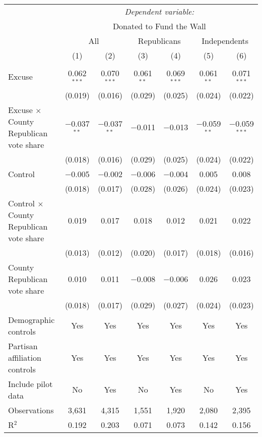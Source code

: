 
\begin{table}[!htbp] \centering 
  \label{t:2-cityheterogeneity} 
\begin{threeparttable}
\begin{tabular}{@{\hspace{5pt}}l@{\hspace{5pt}}cccccc} 
\toprule 
 & \multicolumn{6}{c}{\textit{Dependent variable:}} \\ 
\cmidrule(rr){2-7} 
 & \multicolumn{6}{c}{Donated to Fund the Wall} \\ 
 \cmidrule(rr){2-7}
 & \multicolumn{2}{c}{All} & \multicolumn{2}{c}{Republicans} & \multicolumn{2}{c}{Independents} \\ 
 & (1) & (2) & (3) & (4) & (5) & (6)\\ 
\midrule  
\\[-2.1ex] Excuse & 0.062$^{***}$ & 0.070$^{***}$ & 0.061$^{**}$ & 0.069$^{***}$ & 0.061$^{**}$ & 0.071$^{***}$ \\ 
  & (0.019) & (0.016) & (0.029) & (0.025) & (0.024) & (0.022) \\ 
 \addlinespace 
 Excuse $\times$ County Republican vote share & $-$0.037$^{**}$ & $-$0.037$^{**}$ & $-$0.011 & $-$0.013 & $-$0.059$^{**}$ & $-$0.059$^{***}$ \\ 
  & (0.018) & (0.016) & (0.029) & (0.025) & (0.024) & (0.022) \\ 
 \addlinespace 
 Control & $-$0.005 & $-$0.002 & $-$0.006 & $-$0.004 & 0.005 & 0.008 \\ 
  & (0.018) & (0.017) & (0.028) & (0.026) & (0.024) & (0.023) \\ 
 \addlinespace 
 Control $\times$ County Republican vote share & 0.019 & 0.017 & 0.018 & 0.012 & 0.021 & 0.022 \\ 
  & (0.013) & (0.012) & (0.020) & (0.017) & (0.018) & (0.016) \\ 
 \addlinespace 
 County Republican vote share & 0.010 & 0.011 & $-$0.008 & $-$0.006 & 0.026 & 0.023 \\ 
  & (0.018) & (0.017) & (0.029) & (0.027) & (0.024) & (0.023) \\ 
 \addlinespace 
\midrule  
Demographic controls & Yes & Yes & Yes & Yes & Yes & Yes \\ 
Partisan affiliation controls & Yes & Yes & Yes & Yes & Yes & Yes \\ 
\midrule
Include pilot data & No & Yes & No & Yes & No & Yes \\
\addlinespace
Observations & 3,631 & 4,315 & 1,551 & 1,920 & 2,080 & 2,395 \\ 
R$^{2}$ & 0.192 & 0.203 & 0.071 & 0.073 & 0.142 & 0.156 \\ 
\bottomrule 
\end{tabular} 
\end{threeparttable}
\end{table} 
